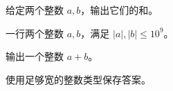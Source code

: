 给定两个整数 $a,b$，输出它们的和。

\InputFile

一行两个整数 $a,b$，满足 $|a|,|b| \leq 10^9$。

\OutputFile

输出一个整数 $a+b$。

\Examples

\begin{example}
%
\end{example}

\Note

使用足够宽的整数类型保存答案。
